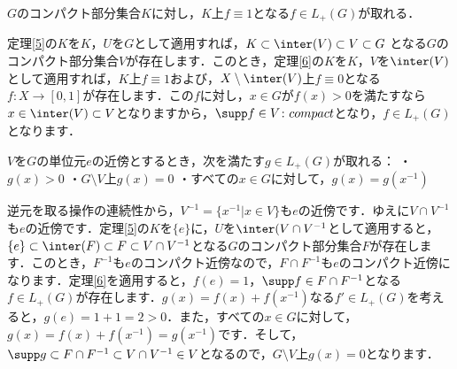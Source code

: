 \begin{lem}\label{14}
$G$のコンパクト部分集合$K$に対し，$K$上$f \equiv 1$となる$f \in L_{+}(G)$が取れる．
\end{lem}
\begin{Proof}
定理\ref{5}の$K$を$K$，$U$を$G$として適用すれば，$K \subset \inter(V) \subset V \subset G$ となる$G$のコンパクト部分集合$V$が存在します．このとき，定理\ref{6}の$K$を$K$，$V$を$\inter(V)$として適用すれば，$K$上$f \equiv 1$および，$X \setminus \inter(V)$上$f \equiv 0$となる$f \colon X \to [0, 1]$が存在します．この$f$に対し，$x \in G$が$f(x)>0$を満たすなら$x \in \inter(V) \subset V$となりますから，$\supp f \in V \colon compact$となり，$f \in L_{+}(G)$となります．
\end{Proof}
\begin{lem}\label{15}
$V$を$G$の単位元$e$の近傍とするとき，次を満たす$g \in L_{+}(G)$が取れる：
・$g(x)>0$
・$G \setminus V$上$g(x)=0$
・すべての$x \in G$に対して，$g(x)=g(x^{-1})$
\end{lem}
\begin{Proof}
逆元を取る操作の連続性から，$V^{-1}=\{ x^{-1} | x \in V \}$も$e$の近傍です．ゆえに$V \cap V^{-1}$も$e$の近傍です．定理\ref{5}の$K$を$\{e\}$に，$U$を$\inter(V \cap V^{-1}$として適用すると，$\{e\} \subset \inter(F) \subset F \subset V \cap V^{-1}$となる$G$のコンパクト部分集合$F$が存在します．このとき，$F^{-1}$も$e$のコンパクト近傍なので，$F \cap F^{-1}$も$e$のコンパクト近傍になります．定理\ref{6}を適用すると，$f(e)=1$，$\supp f \in F \cap F^{-1}$となる$f \in L_{+}(G)$が存在します．$g(x)=f(x)+f(x^{-1})$なる$f' \in L_{+}(G)$を考えると，$g(e)=1+1=2>0$．また，すべての$x \in G$に対して，$g(x)=f(x)+f(x^{-1})=g(x^{-1})$です．そして，$\supp g \subset F \cap F^{-1} \subset V \cap V^{-1} \in V$となるので，$G \setminus V$上$g(x)=0$となります．　
\end{Proof}

